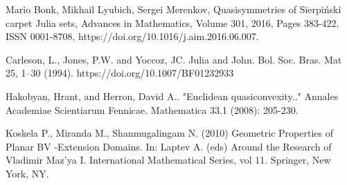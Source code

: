 \begin{thebibliography}{1}
Mario Bonk, Mikhail Lyubich, Sergei Merenkov, Quasisymmetries
of Sierpiński carpet Julia sets, Advances in Mathematics, Volume 301,
2016, Pages 383-422, ISSN 0001-8708, https://doi.org/10.1016/j.aim.2016.06.007.

Carleson, L., Jones, P.W. and Yoccoz, JC. Julia and John. Bol. Soc. Bras. Mat 25, 1–30 (1994). https://doi.org/10.1007/BF01232933

Hakobyan, Hrant, and Herron, David A.. "Euclidean
quasiconvexity.."{} Annales Academiae Scientiarum Fennicae.
Mathematica 33.1 (2008): 205-230.

Koskela P., Miranda M., Shanmugalingam N. (2010) Geometric Properties of Planar BV -Extension Domains. In: Laptev A. (eds) Around the Research of Vladimir Maz'ya I. International Mathematical Series, vol 11. Springer, New York, NY. 
\end{thebibliography}


